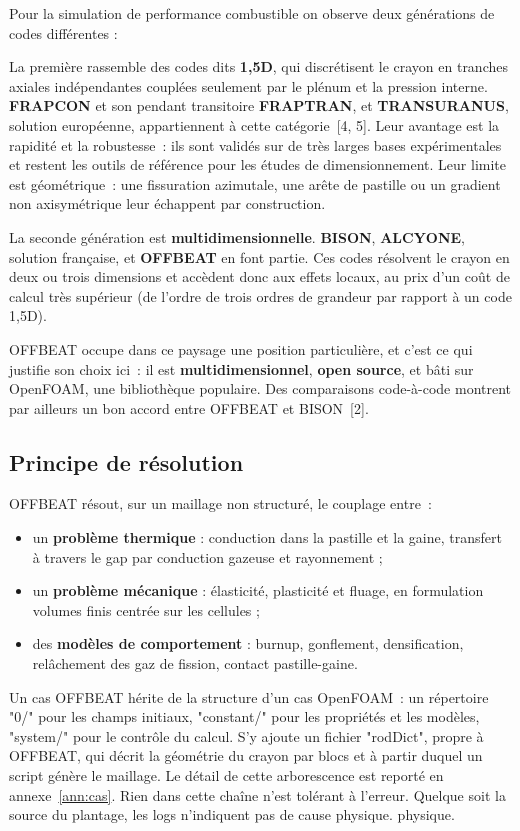 \documentclass[12pt,a4paper,french]{report}
\begin{document}
Pour la simulation de performance combustible on observe deux générations de codes différentes  :

La première rassemble des codes dits \textbf{1,5D}, qui discrétisent le
crayon en tranches axiales indépendantes couplées seulement par le plénum et
la pression interne. \textbf{FRAPCON} et son pendant transitoire
\textbf{FRAPTRAN}, et
\textbf{TRANSURANUS}, solution européenne,
appartiennent à cette catégorie~[4, 5]. Leur avantage est la rapidité et la
robustesse~: ils sont validés sur de très larges bases expérimentales et
restent les outils de référence pour les études de dimensionnement. Leur limite
est géométrique~: une fissuration azimutale, une arête de pastille ou un
gradient non axisymétrique leur échappent par construction.

La seconde génération est \textbf{multidimensionnelle}. \textbf{BISON},
\textbf{ALCYONE}, solution française, et \textbf{OFFBEAT} en font partie. Ces codes
résolvent le crayon en deux ou trois dimensions et accèdent donc aux effets
locaux, au prix d'un coût de calcul très supérieur (de l'ordre de trois ordres
de grandeur par rapport à un code 1,5D).

OFFBEAT occupe dans ce paysage une position particulière, et c'est ce qui
justifie son choix ici~: il est \textbf{multidimensionnel}, \textbf{open
source}, et bâti sur OpenFOAM, une bibliothèque populaire. Des comparaisons
code-à-code montrent par ailleurs un bon accord entre OFFBEAT et BISON~[2].

\subsection{Principe de résolution}

OFFBEAT résout, sur un maillage non structuré, le couplage entre~:
\begin{itemize}
  \item un \textbf{problème thermique} : conduction dans la pastille et la
    gaine, transfert à travers le gap par conduction gazeuse et rayonnement ;
  \item un \textbf{problème mécanique} : élasticité, plasticité et fluage, en
    formulation volumes finis centrée sur les cellules ;
  \item des \textbf{modèles de comportement} : burnup, gonflement,
    densification, relâchement des gaz de fission, contact pastille-gaine.
\end{itemize}

Un cas OFFBEAT hérite de la structure d'un cas OpenFOAM~: un répertoire
"0/" pour les champs initiaux, "constant/" pour les propriétés
et les modèles, "system/" pour le contrôle du calcul. S'y ajoute un
fichier "rodDict", propre à OFFBEAT, qui décrit la géométrie du crayon
par blocs et à partir duquel un script génère le maillage. Le détail de cette
arborescence est reporté en annexe~\ref{ann:cas}. Rien dans cette chaîne n'est
tolérant à l'erreur. Quelque soit la source du plantage, les logs n'indiquent pas de cause physique.
physique.
\end{document}
